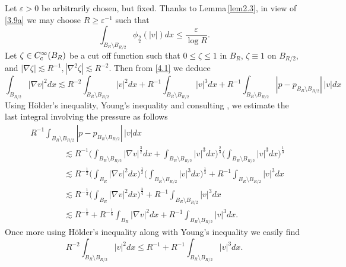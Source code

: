 \documentclass[12pt]{article}
\numberwithin{equation}{section}
\theoremstyle{definition}
\begin{document}
Let $ {\varepsilon} >0$ be arbitrarily chosen, but fixed. Thanks to Lemma\,\ref{lem2.3}, in view of \eqref{3.9a} we may choose  $ R \ge  {\varepsilon} ^{ -1}$ such that 
\begin{equation}
{\int\limits}_{B_{ R}  \setminus B_{ R/2}}  \phi_{ \frac92} (| {v} |) dx \le  \frac{\varepsilon}{\log R}. 
\label{4.2}
\end{equation} 
Let $ \zeta \in C^{\infty}_{\rm c} (B_R)$ be a cut off function such that $ 0 \le \zeta  \le 1$ in $ B_R$, 
$ \zeta \equiv 1$ on $ B_{ R/2}$, and $ | \nabla \zeta |  \lesssim  R^{ -1}, | \nabla ^2 \zeta |  \lesssim  R^{ -2} $. 
Then from \eqref{4.1} we deduce  
\begin{equation}
{\int\limits}_{B_{ R/2}} | \nabla {v} |^2 dx \lesssim  R^{ -2}  {\int\limits}_{B_R  \setminus B_{ R/2}} |{v} |^2 dx
 + R^{ -1}{\int\limits}_{B_R  \setminus B_{ R/2}} | {v} |^3 dx + R^{ -1}{\int\limits}_{B_R  \setminus B_{ R/2}} 
 | p- p_{ B_R  \setminus B_{ R/2}}|\, | {v}| dx
\label{4.3}
\end{equation}
Using H\"older's inequality, Young's inequality and consulting \cite{Galdi}, we estimate the last integral involving the pressure as follows
\begin{align*}
& R^{ -1}{\int\limits}_{B_R  \setminus B_{ R/2}} 
 | p- p_{ B_R  \setminus B_{ R/2}}|\, | {v}|   dx
 \\
 &\qquad \qquad \lesssim  R^{ -1}  
 \bigg({\int\limits}_{B_R  \setminus B_{ R/2}}  | \nabla {v}|^{ \frac32}dx  +{\int\limits}_{B_R  \setminus B_{ R/2}} | {v} |^3 dx\bigg)^{\frac23}
  \bigg({\int\limits}_{B_R  \setminus B_{ R/2}} | {v} |^3dx\bigg)^{ \frac13}
\\
 &\qquad \qquad \lesssim  R^{ -\frac12} \bigg({\int\limits}_{B_R} | \nabla {v} |^2dx \bigg)^{ \frac12} \bigg({\int\limits}_{B_R  \setminus B_{ R/2}} | {v} |^3dx \bigg)^{ \frac13}
 + R^{ -1} {\int\limits}_{B_R  \setminus B_{ R/2}} | {v} |^3 dx
\\
 &\qquad \qquad \lesssim  R^{ -\frac13} \bigg({\int\limits}_{B_R} | \nabla {v} |^2dx \bigg)^{ \frac34} 
+ R^{ -1} {\int\limits}_{B_R  \setminus B_{ R/2}} | {v} |^3dx
\\
 &\qquad \qquad \lesssim  R^{ -\frac18}+  R^{ -\frac16}{\int\limits}_{B_R} | \nabla {v} |^2dx + 
R^{ -1} {\int\limits}_{B_R  \setminus B_{ R/2}} | {v} |^3dx . 
 \end{align*}
 Once more using H\"older's inequality along with Young's inequality we easily find 
\[
R^{ -2}  {\int\limits}_{B_R  \setminus B_{ R/2}} |{v} |^2  dx \le R^{ -1}+ R^{ -1}  {\int\limits}_{B_R  \setminus B_{ R/2}} |{v} |^3 dx.  
\] 
\end{document}
